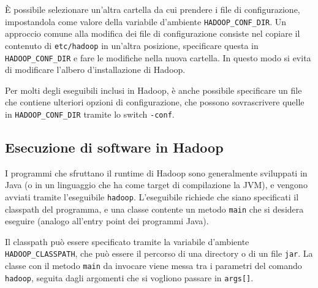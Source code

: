 \documentclass[italian,a4paper, twoside, 12pt]{report}
\begin{document}
È possibile selezionare un'altra cartella da cui prendere i file di
configurazione, impostandola come valore della variabile d'ambiente
\lstinline!HADOOP_CONF_DIR!. Un approccio comune alla modifica dei file
di configurazione consiste nel copiare il contenuto di
\lstinline!etc/hadoop! in un'altra posizione, specificare questa in
\lstinline!HADOOP_CONF_DIR! e fare le modifiche nella nuova cartella. In
questo modo si evita di modificare l'albero d'installazione di Hadoop.

Per molti degli eseguibili inclusi in Hadoop, è anche possibile
specificare un file che contiene ulteriori opzioni di configurazione,
che possono sovrascrivere quelle in \lstinline!HADOOP_CONF_DIR! tramite
lo switch \lstinline!-conf!.

\hypertarget{esecuzione-di-software-in-hadoop}{\subsection{Esecuzione di
software in Hadoop}\label{esecuzione-di-software-in-hadoop}}

I programmi che sfruttano il runtime di Hadoop sono generalmente
sviluppati in Java (o in un linguaggio che ha come target di
compilazione la JVM), e vengono avviati tramite l'eseguibile
\lstinline!hadoop!. L'eseguibile richiede che siano specificati il
classpath del programma, e una classe contente un metodo
\lstinline!main! che si desidera eseguire (analogo all'entry point dei
programmi Java).

Il classpath può essere specificato tramite la variabile d'ambiente
\lstinline!HADOOP_CLASSPATH!, che può essere il percorso di una
directory o di un file \lstinline!jar!. La classe con il metodo
\lstinline!main! da invocare viene messa tra i parametri del comando
\lstinline!hadoop!, seguita dagli argomenti che si vogliono passare in
\lstinline!args[]!.
\end{document}
